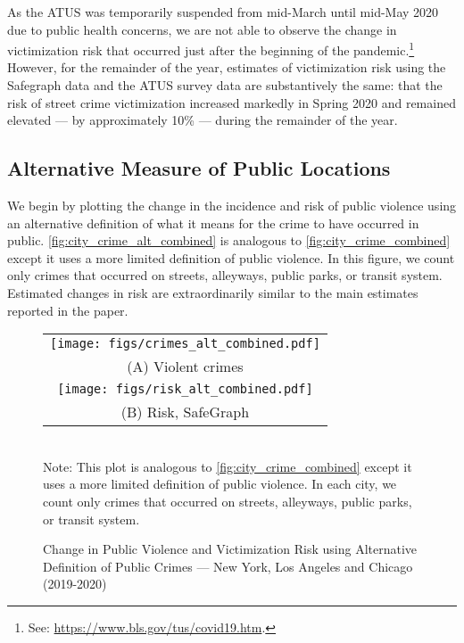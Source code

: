 As the ATUS was temporarily suspended from mid-March until mid-May 2020 due to public health concerns, we are not able to observe the change in victimization risk that occurred just after the beginning of the pandemic.\footnote{See: \url{https://www.bls.gov/tus/covid19.htm}.} However, for the remainder of the year, estimates of victimization risk using the Safegraph data and the ATUS survey data are substantively the same: that the risk of street crime victimization increased markedly in Spring 2020 and remained elevated --- by approximately 10\% --- during the remainder of the year.

 
\subsection{Alternative Measure of Public Locations}  \label{sec:alt_public}

We begin by plotting the change in the incidence and risk of public violence using an alternative definition of what it means for the crime to have occurred in public.  \autoref{fig:city_crime_alt_combined} is analogous to \autoref{fig:city_crime_combined} except it uses a more limited definition of public violence. In this figure, we count only crimes that occurred on streets, alleyways, public parks, or transit system. Estimated changes in risk are extraordinarily similar to the main estimates reported in the paper.

\begin{figure}[h!]
    \caption{Change in Public Violence and Victimization Risk using Alternative Definition of Public Crimes --- New York, Los Angeles and Chicago (2019-2020)}
     \begin{center}
     \begin{tabular}{c}
     \texttt{[image: figs/crimes\_alt\_combined.pdf]} \\ 
     (A) Violent crimes \\ 
     \texttt{[image: figs/risk\_alt\_combined.pdf]} \\ 
     (B) Risk, SafeGraph \\ 
    \end{tabular}
         \end{center}
    \label{fig:city_crime_alt_combined}
    \vspace*{0.5cm}  \\ 
        \newline 
    Note: This plot is analogous to \autoref{fig:city_crime_combined} except it uses a more limited definition of public violence. In each city, we count only crimes that occurred on streets, alleyways, public parks, or transit system. 
\end{figure}

